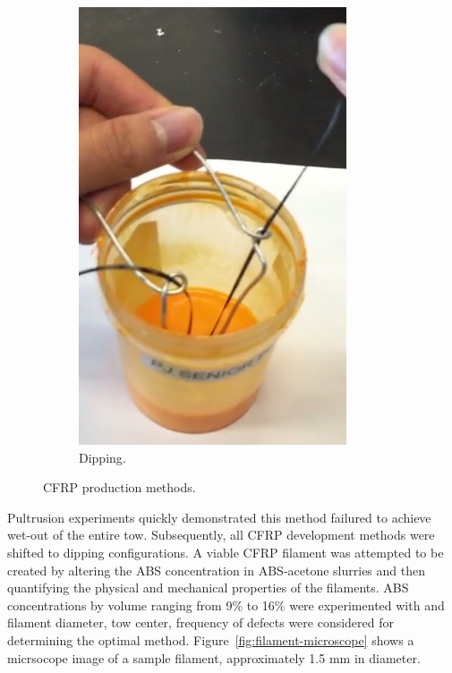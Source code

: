 \begin{figure}[t]
\begin{subfigure}[b]{0.4\linewidth}
                \includegraphics[width=\linewidth]{./figures/dipping-vid}
                \caption{Dipping.}
                \label{fig:dipping-vid}
        \end{subfigure}
        \caption{CFRP production methods.}\label{fig:slurry-making}
\end{figure}

Pultrusion experiments quickly demonstrated this method failured to achieve wet-out of the entire tow. Subsequently, all CFRP development methods were shifted to dipping configurations. A viable CFRP filament was attempted to be created by altering the ABS concentration in ABS-acetone slurries and then quantifying the physical and mechanical properties of the filaments. ABS concentrations by volume ranging from 9\% to 16\% were experimented with and filament diameter, tow center, frequency of defects were considered for determining the optimal method. Figure~\ref{fig:filament-microscope} shows a micrsocope image of a sample filament, approximately 1.5 mm in diameter.

